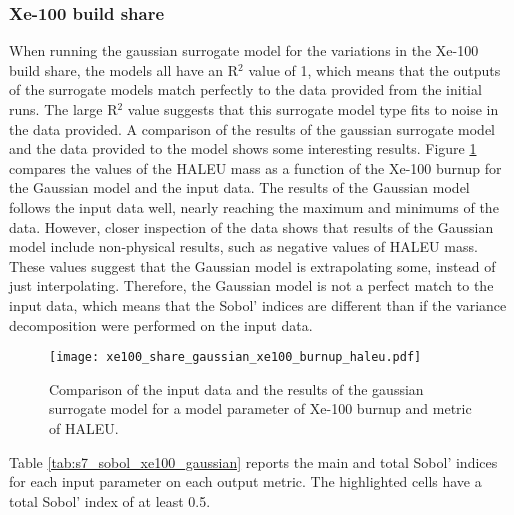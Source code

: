 \subsubsection{Xe-100 build share}
When running the gaussian surrogate model for the variations in the Xe-100 build 
share, the models all  have an R$^2$ value of 1, which means that the outputs of 
the surrogate models match perfectly to the data provided from the initial 
\Cyclus runs. The large R$^2$ value suggests that this surrogate model type 
fits to noise in the data provided. A comparison of the results of the 
gaussian surrogate model and the data provided to the model shows some interesting 
results. Figure \ref{fig:s7_gaussian_share_haleu} compares the values of the
\gls{HALEU} mass as a function of the Xe-100 burnup for the Gaussian model 
and the input data. The results of the Gaussian model follows the input 
data well, nearly reaching the maximum and minimums of the data. However, 
closer inspection of the data shows that results of the Gaussian model 
include non-physical results, such as negative values of \gls{HALEU} mass. 
These values suggest that the Gaussian model is extrapolating some, instead 
of just interpolating. Therefore, the Gaussian model is not a perfect 
match to the input data, which means that the Sobol' indices are different 
than if the variance decomposition were performed on the input data. 

\begin{figure}
    \centering 
    \texttt{[image: xe100\_share\_gaussian\_xe100\_burnup\_haleu.pdf]}
    \caption{Comparison of the input data and the results of the gaussian 
    surrogate model for a model parameter of Xe-100 burnup and 
    metric of HALEU.}
    \label{fig:s7_gaussian_share_haleu}
\end{figure}

Table \ref{tab:s7_sobol_xe100_gaussian} reports the main and total Sobol' indices 
for each input parameter on each output metric. The highlighted cells have 
a total Sobol' index of at least 0.5. 

